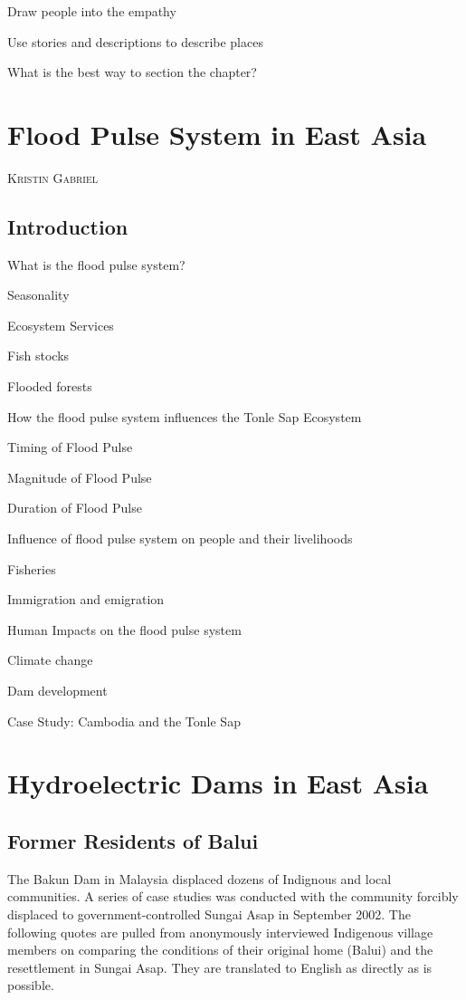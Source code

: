 \documentclass{book}\usepackage{knitr}
\makeatletter
\newcommand{\chapterauthor}[1]{%
  {\parindent0pt\vspace*{-25pt}%
  \linespread{1.1}\large\scshape#1%
  \par\nobreak\vspace*{35pt}}
  \@afterheading%
}
\makeatother
\begin{document}
Draw people into the empathy

Use stories and descriptions to describe places

What is the best way to section the chapter?


\chapter{Flood Pulse System in East Asia}

\chapterauthor{Kristin Gabriel}

\section{Introduction}

What is the flood pulse system?

Seasonality

Ecosystem Services

Fish stocks

Flooded forests

How the flood pulse system influences the Tonle Sap Ecosystem

Timing of Flood Pulse

Magnitude of Flood Pulse

Duration of Flood Pulse

Influence of flood pulse system on people and their livelihoods

Fisheries

Immigration and emigration

Human Impacts on the flood pulse system

Climate change

Dam development

Case Study: Cambodia and the Tonle Sap


\chapter{Hydroelectric Dams in East Asia}
\section{Former Residents of Balui}
The Bakun Dam in Malaysia displaced dozens of Indignous and local communities. A series of case studies was conducted with the community forcibly displaced to government-controlled Sungai Asap in September 2002. The following quotes are pulled from anonymously interviewed Indigenous village members on comparing the conditions of their original home (Balui) and the resettlement in Sungai Asap. They are translated to English as directly as is possible. 
\end{document}

